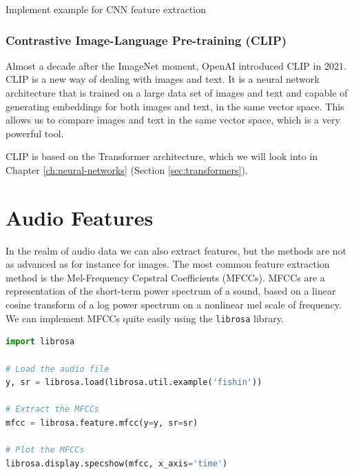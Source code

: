 \framedtext{\color{red}{TODO:}} Implement example for CNN feature extraction

\subsubsection{Contrastive Image-Language Pre-training (CLIP)}
Almost a decade after the ImageNet moment, OpenAI introduced CLIP\cite{radford2021learning} in 2021.
CLIP is a new way of dealing with images and text. It is a neural network architecture that is trained on a large data set of images and text and capable
of generating embeddings for both images and text, in the same vector space.
This allows us to compare images and text in the same vector space, which is a very powerful tool.

CLIP is based on the Transformer architecture, which we will look into in Chapter \ref{ch:neural-networks} (Section \ref{sec:transformers}).

\section{Audio Features}
In the realm of audio data we can also extract features, but the methods are not as advanced as for instance for images.
The most common feature extraction method is the Mel-Frequency Cepstral Coefficients (MFCCs).
MFCCs are a representation of the short-term power spectrum of a sound, based on a linear cosine transform of a log power spectrum on a nonlinear mel scale of frequency.
We can implement MFCCs quite easily using the \lstinline{librosa} library.
\begin{lstlisting}[language=Python, caption={MFCC extraction example using librosa.}, label={code:mfcc}]
import librosa

# Load the audio file
y, sr = librosa.load(librosa.util.example('fishin'))

# Extract the MFCCs
mfcc = librosa.feature.mfcc(y=y, sr=sr)

# Plot the MFCCs
librosa.display.specshow(mfcc, x_axis='time')
\end{lstlisting}

